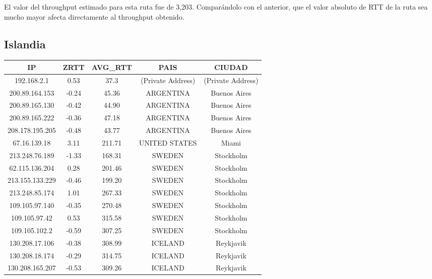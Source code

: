  El valor del throughput estimado para esta ruta fue de 3,203. Comparándolo con el anterior, que el valor absoluto de RTT de la ruta sea mucho mayor afecta directamente al throughput obtenido.
 
\subsection{Islandia}

\begin{tabular}{|c@{\hspace{5ex}}c@{\hspace{5ex}}c@{\hspace{5ex}}c@{\hspace{5ex}}c|}
 \hline
 \rule{0pt}{1.2em}IP & ZRTT & AVG\_RTT & PAIS & CIUDAD\\[0.2em]
 \hline

\rule{0pt}{1.2em} 192.168.2.1  &  0.53 & 37.3 & (Private Address) & (Private Address) \\[0.2em]
\rule{0pt}{1.2em} 200.89.164.153  &  -0.24 & 45.36 & ARGENTINA & Buenos Aires \\[0.2em]
\rule{0pt}{1.2em} 200.89.165.130  &  -0.42 & 44.90 & ARGENTINA & Buenos Aires \\[0.2em]
\rule{0pt}{1.2em} 200.89.165.222  &  -0.36 & 47.18 & ARGENTINA & Buenos Aires \\[0.2em]
\rule{0pt}{1.2em} 208.178.195.205  &  -0.48 & 43.77 & ARGENTINA & Buenos Aires \\[0.2em]
\rule{0pt}{1.2em} 67.16.139.18  &  3.11 & 211.71 & UNITED STATES & Miami \\[0.2em]
\rule{0pt}{1.2em} 213.248.76.189  &  -1.33 & 168.31 & SWEDEN & Stockholm \\[0.2em]
\rule{0pt}{1.2em} 62.115.136.204  &  0.28 & 201.46 & SWEDEN & Stockholm \\[0.2em]
\rule{0pt}{1.2em} 213.155.133.229  &  -0.46 & 199.20 & SWEDEN & Stockholm \\[0.2em]
\rule{0pt}{1.2em} 213.248.85.174  &  1.01 & 267.33 & SWEDEN & Stockholm \\[0.2em]
\rule{0pt}{1.2em} 109.105.97.140  &  -0.35 & 270.48 & SWEDEN & Stockholm \\[0.2em]
\rule{0pt}{1.2em} 109.105.97.42  &  0.53 & 315.58 & SWEDEN & Stockholm \\[0.2em]
\rule{0pt}{1.2em} 109.105.102.2  &  -0.59 & 307.25 & SWEDEN & Stockholm \\[0.2em]
\rule{0pt}{1.2em} 130.208.17.106  &  -0.38 & 308.99 & ICELAND & Reykjavik \\[0.2em]
\rule{0pt}{1.2em} 130.208.18.174  &  -0.29 & 314.75 & ICELAND & Reykjavik \\[0.2em]
\rule{0pt}{1.2em} 130.208.165.207  &  -0.53 & 309.26 & ICELAND & Reykjavik \\[0.2em]
\hline
 \end{tabular}

